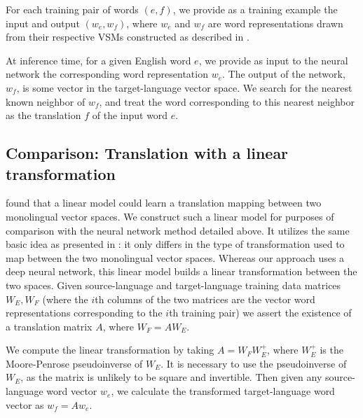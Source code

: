 \documentclass[11pt]{article}
\begin{document}
For each training pair of words $(e, f)$, we provide as a training example the
input and output $(w_e, w_f)$, where $w_e$ and $w_f$ are word representations
drawn from their respective VSMs constructed as described in
.

At inference time, for a given English word $e$, we provide as input to the
neural network the corresponding word representation $w_e$. The output of the
network, $w_f$, is some vector in the target-language vector space. We search
for the nearest known neighbor of $w_f$, and treat the word corresponding to
this nearest neighbor as the translation $f$ of the input word $e$.

\subsection{Comparison: Translation with a linear transformation}
\label{subsec:translation-linear}

 found that a linear model could learn a
translation mapping between two monolingual vector spaces. We construct such a
linear model for purposes of comparison with the neural network method detailed
above. It utilizes the same basic idea as presented in :
it only differs in the type of transformation used to map between the two
monolingual vector spaces. Whereas our approach uses a deep neural network, this
linear model builds a linear transformation between the two spaces. Given
source-language and target-language training data matrices $W_E, W_F$ (where the
$i$th columns of the two matrices are the vector word representations
corresponding to the $i$th training pair) we assert the existence of a
translation matrix $A$, where $W_F = AW_E$.

We compute the linear transformation by taking $A = W_F W_E^+$, where $W_E^+$ is
the Moore-Penrose pseudoinverse of $W_E$. It is necessary to use the
pseudoinverse of $W_E$, as the matrix is unlikely to be square and invertible.
Then given any source-language word vector $w_e$, we calculate the transformed
target-language word vector as $w_f = A w_e$.
\end{document}
